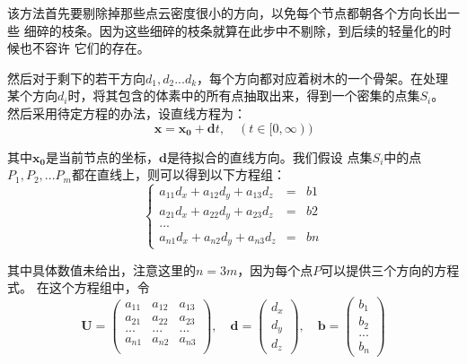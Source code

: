 该方法首先要剔除掉那些点云密度很小的方向，以免每个节点都朝各个方向长出一些
细碎的枝条。因为这些细碎的枝条就算在此步中不剔除，到后续的轻量化的时候也不容许
它们的存在。

然后对于剩下的若干方向$d_1,d_2...d_k$，每个方向都对应着树木的一个骨架。在处理
某个方向$d_i$时，将其包含的体素中的所有点抽取出来，得到一个密集的点集$S_i$。
然后采用待定方程的办法，设直线方程为：
\begin{equation}
	\mathbf{x} = \mathbf{x_0} + \mathbf{d}t,\quad(t \in [0,\infty))
\end{equation}

其中$\mathbf{x_0}$是当前节点的坐标，$\mathbf{d}$是待拟合的直线方向。我们假设
点集$S_i$中的点$P_1,P_2,...P_m$都在直线上，则可以得到以下方程组：\\

\begin{equation} \label{eq:line}
	\left\{ 
		\begin{array}{lll}
			a_{11}d_x+a_{12}d_y+a_{13}d_z & = & b1\\
			a_{21}d_x+a_{22}d_y+a_{23}d_z & = & b2\\
			... & & \\
			a_{n1}d_x+a_{n2}d_y+a_{n3}d_z & = & bn
		\end{array}
	\right.
\end{equation}

其中具体数值未给出，注意这里的$n=3m$，因为每个点$P$可以提供三个方向的方程式。
在这个方程组中，令\\
\begin{displaymath}
	\mathbf{U}=
\left(
\begin{array}{ccc}
	a_{11} & a_{12} & a_{13}\\
	a_{21} & a_{22} & a_{23}\\
	... & ... & ...\\
	a_{n1} & a_{n2} & a_{n3}\\
\end{array}
\right)
,\quad
\mathbf{d}=
\left(
\begin{array}{c}
	d_x\\
	d_y\\
	d_z
\end{array}
\right)
,\quad
\mathbf{b}=
\left(
\begin{array}{c}
	b_1\\
	b_2\\
	...\\
	b_n
\end{array}
\right)
\end{displaymath}


